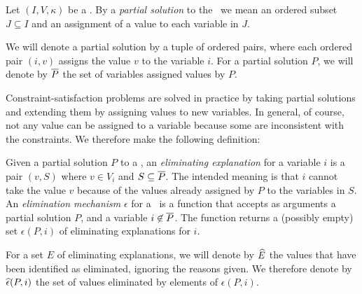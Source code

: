 \begin{definition} Let $(I,V,\kappa)$ be a \csp.  By a {\em partial
solution\/} to the \csp\ we mean an ordered subset $J\subseteq I$ and
an assignment of a value to each variable in $J$.

We will denote a partial solution by a tuple of ordered pairs, where
each ordered pair $(i,v)$ assigns the value $v$ to the variable $i$.
For a partial solution $P$, we will denote by $\overline P$ the set of
variables assigned values by $P$.
 \end{definition}

Constraint-satisfaction problems are solved in practice by taking
partial solutions and extending them by assigning values to new
variables.  In general, of course, not any value can be assigned to a
variable because some are inconsistent with the constraints.  We
therefore make the following definition:

\begin{definition} Given a partial solution $P$ to a \csp, an {\em
eliminating explanation\/} for a variable $i$ is a pair $(v,S)$ where
$v\in V_i$ and $S\subseteq \overline P$.  The intended meaning is that $i$
cannot take the value $v$ because of the values already assigned by
$P$ to the variables in $S$.
 An {\em elimination mechanism\/} $\epsilon$ for a
\csp\ is a function that accepts as arguments a partial solution $P$,
and a variable $i\not\in\overline P$.  The function returns a (possibly
empty) set $\epsilon(P,i)$ of eliminating explanations for $i$.
 \label{d.eliminate}
 \end{definition}

For a set $E$ of eliminating explanations, we will denote by $\widehat E$
the values that have been identified as eliminated, ignoring the
reasons given.  We therefore denote by $\widehat\epsilon(P,i)$ the set of
values eliminated by elements of $\epsilon(P,i)$.

